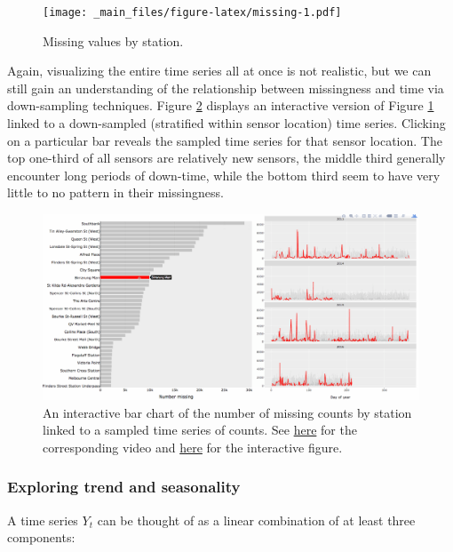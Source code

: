 \documentclass[12pt,]{article}
\theoremstyle{definition}
\theoremstyle{definition}
\theoremstyle{remark}
\begin{document}
\begin{figure}
\centering
\texttt{[image: \_main\_files/figure-latex/missing-1.pdf]}
\caption{\label{fig:missing}Missing values by station.}
\end{figure}

Again, visualizing the entire time series all at once is not realistic,
but we can still gain an understanding of the relationship between
missingness and time via down-sampling techniques. Figure
\ref{fig:missing-by-time} displays an interactive version of Figure
\ref{fig:missing} linked to a down-sampled (stratified within sensor
location) time series. Clicking on a particular bar reveals the sampled
time series for that sensor location. The top one-third of all sensors
are relatively new sensors, the middle third generally encounter long
periods of down-time, while the bottom third seem to have very little to
no pattern in their missingness.

\begin{figure}
\centering
\includegraphics{images/pedestrians-missing.pdf}
\caption{\label{fig:missing-by-time}An interactive bar chart of the number
of missing counts by station linked to a sampled time series of counts.
See \href{https://vimeo.com/189035350}{here} for the corresponding video
and \href{http://cpsievert.github.io/pedestrians/missing-by-time/}{here}
for the interactive figure.}
\end{figure}

\subsubsection{Exploring trend and
seasonality}\label{exploring-trend-and-seasonality}

A time series \(Y_t\) can be thought of as a linear combination of at
least three components:
\end{document}
